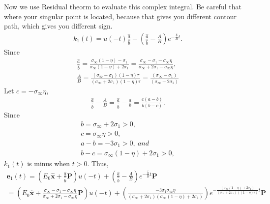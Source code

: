 \documentclass[a4paper, 11pt]{article}
\begin{document}
Now we use Residual theorm to evaluate this complex integral. Be careful that where your singular point is located, because that gives you different contour path, which gives you different sign.
\begin{align}
	k_1(t) = u(-t)\frac{\hat{a}}{\hat{b}} + (\frac{\hat{a}}{\hat{b}}-\frac{A}{B})e^{-\frac{\hat{b}}{B}t}.
	\label{eq:IPspheq3}		
\end{align}	
Since 
\begin{align*}
	\frac{\hat{a}}{\hat{b}} = \frac{\sigma_{\infty}(1-\eta)-\sigma_1}{\sigma_{\infty}(1-\eta)+2\sigma_1}
							= \frac{\sigma_{\infty}-\sigma_1-\sigma_{\infty}\eta}{\sigma_{\infty}+2\sigma_1-\sigma_{\infty}\eta}, \\
	\frac{A}{B}	= \frac{(\sigma_{\infty}-\sigma_1)(1-\eta)\tau}{(\sigma_{\infty}+2\sigma_1)(1-\eta)\tau} 
				= \frac{(\sigma_{\infty}-\sigma_1)}{(\sigma_{\infty}+2\sigma_1)}							
\end{align*}	
Let $c=-\sigma_{\infty}\eta$,
\begin{align*}
	\frac{\hat{a}}{\hat{b}}-\frac{A}{B} = \frac{\hat{a}}{\hat{b}}-\frac{a}{b} = \frac{c(a-b)}{b(b-c)}.
\end{align*}	
Since 
\begin{align*}
	b=\sigma_{\infty}+2\sigma_1>0, \\
	c=\sigma_{\infty}\eta>0, \\
	a-b=-3\sigma_1>0, \ and \\
	b-c=\sigma_{\infty}(1-\eta)+2\sigma_1>0,
\end{align*}	
$k_1(t)$ is minus when $t>0$. Thus, 
\begin{align}
	\mathbf{e}_1(t) = (E_0\mathbf{\hat{x}}+\frac{\hat{a}}{\hat{b}}\mathbf{P})u(-t) + (\frac{\hat{a}}{\hat{b}}-\frac{A}{B})e^{-\frac{\hat{b}}{B}t}\mathbf{P} \nonumber \\
	=(E_0\mathbf{\hat{x}}+\frac{\sigma_{\infty}-\sigma_1-\sigma_{\infty}\eta}{\sigma_{\infty}+2\sigma_1-\sigma_{\infty}\eta}\mathbf{P})u(-t) + (\frac{-3\sigma_1\sigma_{\infty}\eta}{(\sigma_{\infty}+2\sigma_1)(\sigma_{\infty}(1-\eta)+2\sigma_1)})
	e^{-\frac{(\sigma_{\infty}(1-\eta)+2\sigma_1)}{(\sigma_{\infty} + 2\sigma_1)((1-\eta)\tau)}t}\mathbf{P}
	\label{eq:IPspheq4}		
\end{align}
\end{document}
